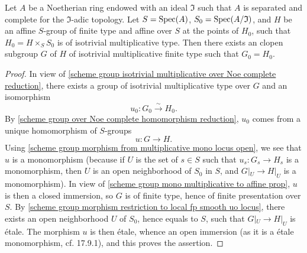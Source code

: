 \begin{theorem}\label{scheme group over Noe complete reduction multiplicative clopen lifting}
Let $A$ be a Noetherian ring endowed with an ideal $\mathfrak{I}$ such that $A$ is separated and complete for the $\mathfrak{I}$-adic topology. Let $S=\mathrm{Spec}(A)$, $S_0=\mathrm{Spec}(A/\mathfrak{I})$, and $H$ be an affine $S$-group of finite type and affine over $S$ at the points of $H_0$, such that $H_0=H\times_SS_0$ is of isotrivial multiplicative type. Then there exists an clopen subgroup $G$ of $H$ of isotrivial multiplicative finite type such that $G_0=H_0$.
\end{theorem}
\begin{proof}
In view of \cref{scheme group isotrivial multiplicative over Noe complete reduction}, there exists a group of isotrivial multiplicative type over $G$ and an isomorphism
\[u_0:G_0\stackrel{\sim}{\to} H_0.\]
By \cref{scheme group over Noe complete homomorphism reduction}, $u_0$ comes from a unique homomorphism of $S$-groups
\[u:G\to H.\]
Using \cref{scheme group morphism from multiplicative mono locus open}, we see that $u$ is a monomorphism (because if $U$ is the set of $s\in S$ such that $u_s:G_s\to H_s$ is a monomorphism, then $U$ is an open neighborhood of $S_0$ in $S$, and $G|_U\to H|_U$ is a monomorphism). In view of \cref{scheme group mono multiplicative to affine prop}, $u$ is then a closed immersion, so $G$ is of finite type, hence of finite presentation over $S$. By \cref{scheme group morphism restriction to local fp smooth uo locus}, there exists an open neighborhood $U$ of $S_0$, hence equals to $S$, such that $G|_U\to H|_U$ is \'etale. The morphism $u$ is then \'etale, whence an open immersion (as it is a \'etale monomorphism, cf. \cite{EGA4-4} 17.9.1), and this proves the assertion.
\end{proof}

